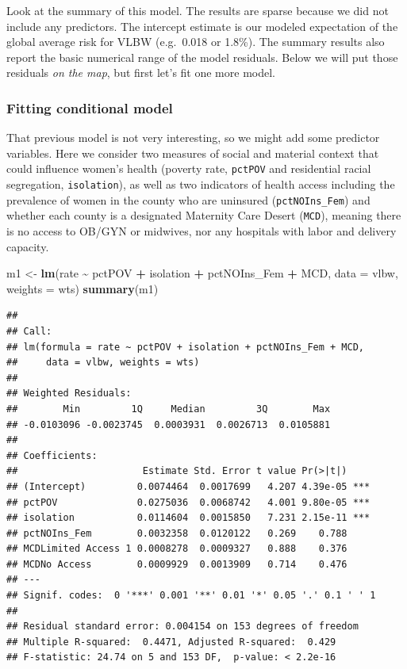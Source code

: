 \documentclass[
]{book}
\newenvironment{Shaded}{\begin{snugshade}}{\end{snugshade}}
\newcommand{\AttributeTok}[1]{\textcolor[rgb]{0.13,0.29,0.53}{#1}}
\newcommand{\FunctionTok}[1]{\textcolor[rgb]{0.13,0.29,0.53}{\textbf{#1}}}
\newcommand{\NormalTok}[1]{#1}
\newcommand{\OtherTok}[1]{\textcolor[rgb]{0.56,0.35,0.01}{#1}}
\newcommand{\SpecialCharTok}[1]{\textcolor[rgb]{0.81,0.36,0.00}{\textbf{#1}}}
\begin{document}
Look at the summary of this model. The results are sparse because we did not include any predictors. The intercept estimate is our modeled expectation of the global average risk for VLBW (e.g.~0.018 or 1.8\%). The summary results also report the basic numerical range of the model residuals. Below we will put those residuals \emph{on the map}, but first let's fit one more model.

\hypertarget{fitting-conditional-model}{%
\subsubsection{Fitting conditional model}\label{fitting-conditional-model}}

That previous model is not very interesting, so we might add some predictor variables. Here we consider two measures of social and material context that could influence women's health (poverty rate, \texttt{pctPOV} and residential racial segregation, \texttt{isolation}), as well as two indicators of health access including the prevalence of women in the county who are uninsured (\texttt{pctNOIns\_Fem}) and whether each county is a designated Maternity Care Desert (\texttt{MCD}), meaning there is no access to OB/GYN or midwives, nor any hospitals with labor and delivery capacity.

\begin{Shaded}
\begin{Highlighting}[]
\NormalTok{m1 }\OtherTok{\textless{}{-}} \FunctionTok{lm}\NormalTok{(rate }\SpecialCharTok{\textasciitilde{}}\NormalTok{ pctPOV }\SpecialCharTok{+}\NormalTok{ isolation }\SpecialCharTok{+}\NormalTok{ pctNOIns\_Fem }\SpecialCharTok{+}\NormalTok{ MCD,}
         \AttributeTok{data =}\NormalTok{ vlbw,}
         \AttributeTok{weights =}\NormalTok{ wts)}
\FunctionTok{summary}\NormalTok{(m1)}
\end{Highlighting}
\end{Shaded}

\begin{verbatim}
## 
## Call:
## lm(formula = rate ~ pctPOV + isolation + pctNOIns_Fem + MCD, 
##     data = vlbw, weights = wts)
## 
## Weighted Residuals:
##        Min         1Q     Median         3Q        Max 
## -0.0103096 -0.0023745  0.0003931  0.0026713  0.0105881 
## 
## Coefficients:
##                      Estimate Std. Error t value Pr(>|t|)    
## (Intercept)         0.0074464  0.0017699   4.207 4.39e-05 ***
## pctPOV              0.0275036  0.0068742   4.001 9.80e-05 ***
## isolation           0.0114604  0.0015850   7.231 2.15e-11 ***
## pctNOIns_Fem        0.0032358  0.0120122   0.269    0.788    
## MCDLimited Access 1 0.0008278  0.0009327   0.888    0.376    
## MCDNo Access        0.0009929  0.0013909   0.714    0.476    
## ---
## Signif. codes:  0 '***' 0.001 '**' 0.01 '*' 0.05 '.' 0.1 ' ' 1
## 
## Residual standard error: 0.004154 on 153 degrees of freedom
## Multiple R-squared:  0.4471, Adjusted R-squared:  0.429 
## F-statistic: 24.74 on 5 and 153 DF,  p-value: < 2.2e-16
\end{verbatim}
\end{document}
